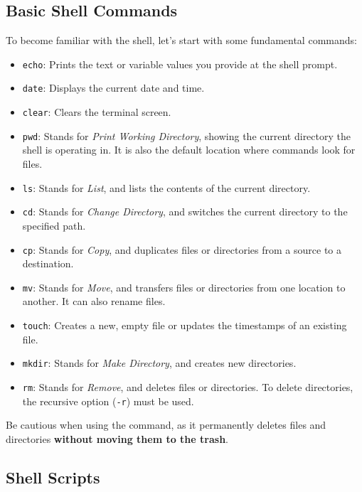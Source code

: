 \subsection{Basic Shell Commands}

To become familiar with the shell, let’s start with some fundamental commands:

\begin{itemize}
    \item \texttt{echo}: Prints the text or variable values you provide at the shell prompt.
    \item \texttt{date}: Displays the current date and time.
    \item \texttt{clear}: Clears the terminal screen.
    \item \texttt{pwd}: Stands for \textit{Print Working Directory}, showing the current directory the shell is operating in. It is also the default location where commands look for files.
    \item \texttt{ls}: Stands for \textit{List}, and lists the contents of the current directory.
    \item \texttt{cd}: Stands for \textit{Change Directory}, and switches the current directory to the specified path.
    \item \texttt{cp}: Stands for \textit{Copy}, and duplicates files or directories from a source to a destination.
    \item \texttt{mv}: Stands for \textit{Move}, and transfers files or directories from one location to another. It can also rename files.
    \item \texttt{touch}: Creates a new, empty file or updates the timestamps of an existing file.
    \item \texttt{mkdir}: Stands for \textit{Make Directory}, and creates new directories.
    \item \texttt{rm}: Stands for \textit{Remove}, and deletes files or directories. To delete directories, the recursive option (\texttt{-r}) must be used.
\end{itemize}

\begin{warningblock}
    Be cautious when using the \phantom{ }\phantom{ } command, as it permanently deletes files and directories \textbf{without moving them to the trash}.
\end{warningblock}

\subsection{Shell Scripts}

